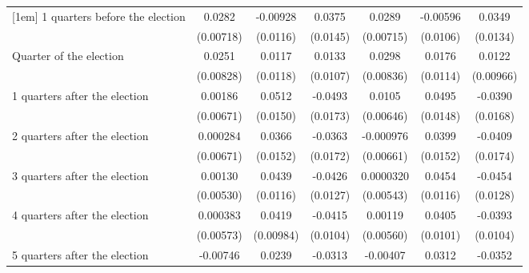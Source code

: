 \begin{table}[htbp]
\begin{tabular}{l*{6}{c}}
[1em]
 1 quarters before the election&      0.0282\sym{***}&    -0.00928         &      0.0375\sym{**} &      0.0289\sym{***}&    -0.00596         &      0.0349\sym{**} \\
                    &   (0.00718)         &    (0.0116)         &    (0.0145)         &   (0.00715)         &    (0.0106)         &    (0.0134)         \\
[1em]
Quarter of the election&      0.0251\sym{**} &      0.0117         &      0.0133         &      0.0298\sym{***}&      0.0176         &      0.0122         \\
                    &   (0.00828)         &    (0.0118)         &    (0.0107)         &   (0.00836)         &    (0.0114)         &   (0.00966)         \\
[1em]
 1 quarters after the election&     0.00186         &      0.0512\sym{***}&     -0.0493\sym{**} &      0.0105         &      0.0495\sym{***}&     -0.0390\sym{*}  \\
                    &   (0.00671)         &    (0.0150)         &    (0.0173)         &   (0.00646)         &    (0.0148)         &    (0.0168)         \\
[1em]
 2 quarters after the election&    0.000284         &      0.0366\sym{*}  &     -0.0363\sym{*}  &   -0.000976         &      0.0399\sym{**} &     -0.0409\sym{*}  \\
                    &   (0.00671)         &    (0.0152)         &    (0.0172)         &   (0.00661)         &    (0.0152)         &    (0.0174)         \\
[1em]
 3 quarters after the election&     0.00130         &      0.0439\sym{***}&     -0.0426\sym{***}&   0.0000320         &      0.0454\sym{***}&     -0.0454\sym{***}\\
                    &   (0.00530)         &    (0.0116)         &    (0.0127)         &   (0.00543)         &    (0.0116)         &    (0.0128)         \\
[1em]
 4 quarters after the election&    0.000383         &      0.0419\sym{***}&     -0.0415\sym{***}&     0.00119         &      0.0405\sym{***}&     -0.0393\sym{***}\\
                    &   (0.00573)         &   (0.00984)         &    (0.0104)         &   (0.00560)         &    (0.0101)         &    (0.0104)         \\
[1em]
 5 quarters after the election&    -0.00746         &      0.0239\sym{*}  &     -0.0313\sym{**} &    -0.00407         &      0.0312\sym{**} &     -0.0352\sym{**} \\

\end{tabular}
\end{table}
